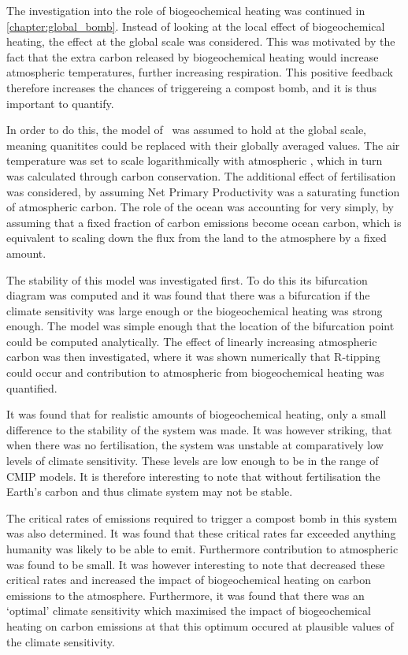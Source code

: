The investigation into the role of biogeochemical heating was continued in \cref{chapter:global_bomb}. Instead of looking at the local effect of biogeochemical heating,
the effect at the global scale was considered. This was motivated by the fact that the extra carbon released by biogeochemical heating would increase atmospheric temperatures,
further increasing respiration. This positive feedback therefore increases the chances of triggereing a compost bomb, and it is thus important to quantify.

In order to do this, the model of~\cite{Luke2011} was assumed to hold at the global scale, meaning quanitites could be replaced with their globally averaged values. The air temperature
was set to scale logarithmically with atmospheric , which in turn was calculated through carbon conservation. The additional effect of  fertilisation was considered,
by assuming Net Primary Productivity was a saturating function of atmospheric carbon. The role of the ocean was accounting for very simply, by assuming that a fixed fraction of
carbon emissions become ocean carbon, which is equivalent to scaling down the flux from the land to the atmosphere by a fixed amount.

The stability of this model was investigated first. To do this its bifurcation diagram was computed and it was found that there was a bifurcation if the climate sensitivity was large enough
or the biogeochemical heating was strong enough. The model was simple enough that the location of the bifurcation point could be computed analytically. The effect of linearly increasing
atmospheric carbon was then investigated, where it was shown numerically that R-tipping could occur and contribution to atmospheric  from biogeochemical heating was quantified.

It was found that for realistic amounts of biogeochemical heating, only a small difference to the stability of the system was made. It was however striking, that when there was no
 fertilisation, the system was unstable at comparatively low levels of climate sensitivity. These levels are low enough to be in the range of CMIP models. It is therefore interesting to note
that without  fertilisation the Earth's carbon and thus climate system may not be stable.

The critical rates of emissions required to trigger a compost bomb in this system was also determined. It was found that these critical rates far exceeded anything humanity was likely to be able
to emit. Furthermore contribution to atmospheric  was found to be small. It was however interesting to note that  decreased these critical rates and increased the impact of
biogeochemical heating on carbon emissions to the atmosphere. Furthermore, it was found that there was an `optimal' climate sensitivity which maximised the impact of biogeochemical heating
on carbon emissions at that this optimum occured at plausible values of the climate sensitivity.

